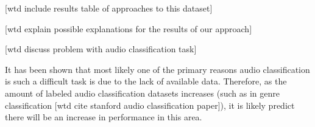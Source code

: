 [wtd include results table of approaches to this dataset]

[wtd explain possible explanations for the results of our approach]

[wtd discuss problem with audio classification task]

It has been shown that most likely one of the primary reasons audio classification is such a difficult task is due to the lack of available data.  Therefore, as the amount of labeled audio classification datasets increases (such as in genre classification [wtd cite stanford audio classification paper]), it is likely predict there will be an increase in performance in this area.

